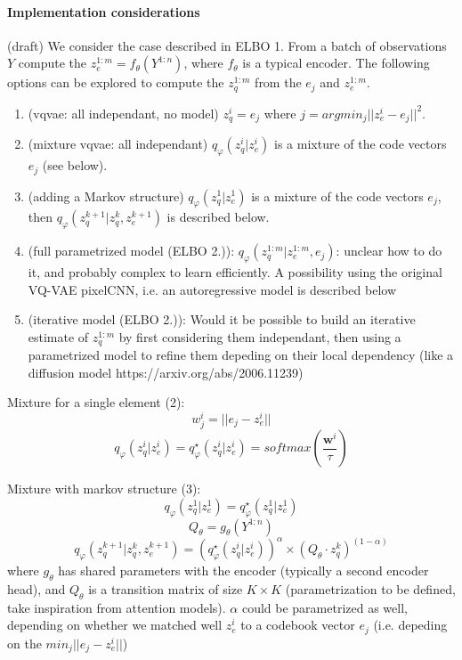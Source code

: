 \documentclass{article}
\begin{document}
\paragraph{Implementation considerations}
(draft) We consider the case described in ELBO 1. From a batch of observations $Y$ compute the $z_e^{1:m} = f_{\theta}(Y^{1:n})$, where $f_{\theta}$ is a typical encoder. The following options can be explored to compute the $z_q^{1:m}$ from the $e_j$ and $z_e^{1:m}$.
\begin{enumerate}
\item (vqvae: all independant, no model) $z_q^{i} = e_j$ where $j = argmin_j ||z_e^i - e_j||^2$.
\item (mixture vqvae: all independant) $q_\varphi(z_q^{i}|z_e^{i})$ is a mixture of the code vectors $e_j$ (see below).
\item (adding a Markov structure) $q_\varphi(z_q^{1}|z_e^{1})$ is a mixture of the code vectors $e_j$, then $q_\varphi(z_q^{k+1}|z_q^{k},z_e^{k+1})$ is described below.
\item (full parametrized model (ELBO 2.)): $q_\varphi(z_q^{1:m}|z_e^{1:m}, e_j)$: unclear how to do it, and probably complex to learn efficiently. A possibility using the original VQ-VAE pixelCNN, i.e. an autoregressive model is described below
\item (iterative model (ELBO 2.)): Would it be possible to build an iterative estimate of $z_q^{1:m}$ by first considering them independant, then using a parametrized model to refine them depeding on their local dependency (like a diffusion model https://arxiv.org/abs/2006.11239)
\end{enumerate}

Mixture for a single element (2):
$$w_j^{i} = ||e_j - z_e^{i}||$$
$$q_\varphi(z_q^{i}|z_e^{i}) = q^\star_\varphi(z_q^{i}|z_e^{i}) = softmax(\frac{\mathbf{w}^{i}}{\tau})$$


Mixture with markov structure (3):
$$q_\varphi(z_q^{1}|z_e^{1}) = q^\star_\varphi(z_q^{1}|z_e^{1})$$
$$Q_{\theta} = g_{\theta}(Y^{1:n})$$
$$q_\varphi(z_q^{k+1}|z_q^{k},z_e^{k+1}) = (q^\star_\varphi(z_q^{i}|z_e^{i}))^\alpha \times (Q_{\theta} \cdot z_q^{k})^{(1 - \alpha)}$$
where $g_{\theta}$ has shared parameters with the encoder (typically a second encoder head), and $Q_{\theta}$ is a transition matrix of size $K \times K$ (parametrization to be defined, take inspiration from attention models). $\alpha$ could be parametrized as well, depending on whether we matched well $z_e^i$ to a codebook vector $e_j$ (i.e. depeding on the  $min_j||e_j - z_e^{i}||$)
\end{document}
